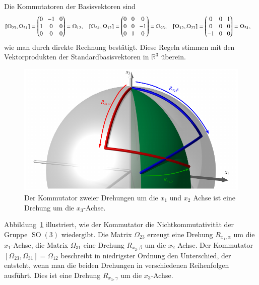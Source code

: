 Die Kommutatoren der Basisvektoren sind
\begin{equation}
\setlength\arraycolsep{4pt}
\begin{aligned}
[\Omega_{23},\Omega_{31}]
&=
\begin{pmatrix}
0&-1&0\\
1&0&0\\
0&0&0
\end{pmatrix}
=
\Omega_{12},
&
[\Omega_{31},\Omega_{12}]
&=
\begin{pmatrix}
0&0&0\\
0&0&-1\\
0&1&0
\end{pmatrix}
=
\Omega_{23},
&
[\Omega_{12},\Omega_{23}]
&=
\begin{pmatrix}
0&0&1\\
0&0&0\\
-1&0&0
\end{pmatrix}
=
\Omega_{31},
\end{aligned}
\label{buch:gruppen:eqn:so3-kommutatoren}
\end{equation}
wie man durch direkte Rechnung bestätigt.
Diese Regeln stimmen mit den Vektorprodukten der Standardbasisvektoren
in $\mathbb{R}^3$ überein.

\begin{figure}
\centering
\includegraphics{chapters/60-gruppen/images/nichtkomm.pdf}
\caption{Der Kommutator zweier Drehungen um die $x_1$ und $x_2$
Achse ist eine Drehung um die $x_3$-Achse.
\label{buch:lie:fig:kommutator}}
\end{figure}
Abbildung~\ref{buch:lie:fig:kommutator} illustriert, wie der
Kommutator die Nichtkommutativität der Gruppe $\operatorname{SO}(3)$
wiedergibt.
Die Matrix $\Omega_{23}$ erzeugt eine Drehung $R_{x_1,\alpha}$
um die $x_1$-Achse,
die Matrix $\Omega_{31}$ eine Drehung $R_{x_2,\beta}$ um die $x_2$ Achse.
Der Kommutator $[\Omega_{23},\Omega_{31}]=\Omega_{12}$ beschreibt in
niedrigster Ordnung den Unterschied, der entsteht, wenn man die
beiden Drehungen in verschiedenen Reihenfolgen ausführt.
Dies ist eine Drehung $R_{x_3,\gamma}$ um die $x_3$-Achse.


